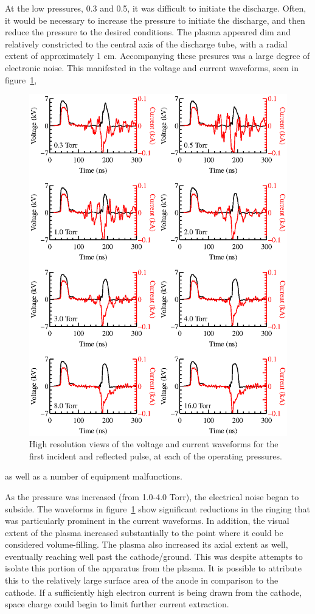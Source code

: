 At the low pressures, 0.3 and 0.5, it was difficult to initiate the discharge.
Often, it would be necessary to increase the pressure to initiate the discharge,
and then reduce the pressure to the desired conditions. The plasma appeared dim
and relatively constricted to the central axis of the discharge tube, with a
radial extent of approximately 1 cm. Accompanying these presures was a large
degree of electronic noise. This manifested in the voltage and current
waveforms, seen in figure~\ref{fig:waveforms},
\begin{figure}
  \centering
  \includegraphics{./chapters/experiment/figures/waveforms.eps}
  \caption{High resolution views of the voltage and current waveforms for the
  first incident and reflected pulse, at each of the operating pressures.}
  \label{fig:waveforms}
\end{figure}
as well as a number of equipment malfunctions.

As the pressure was increased (from 1.0-4.0 Torr), the electrical noise began to
subside. The waveforms in figure~\ref{fig:waveforms} show significant reductions
in the ringing that was particularly prominent in the current waveforms. In
addition, the visual extent of the plasma increased substantially to the point
where it could be considered volume-filling. The plasma also increased its axial
extent as well, eventually reaching well past the cathode/ground. This was
despite attempts to isolate this portion of the apparatus from the plasma. It is
possible to attribute this to the relatively large surface area of the anode in
comparison to the cathode. If a sufficiently high electron current is being
drawn from the cathode, space charge could begin to limit further current
extraction.

